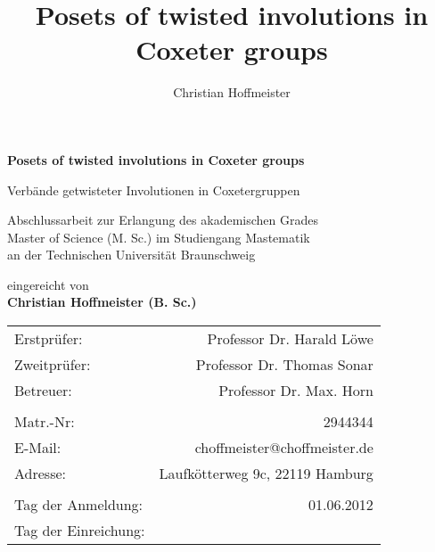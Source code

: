 \title{Posets of twisted involutions in Coxeter groups}
\author{Christian Hoffmeister}

\begin{titlepage}
\begin{center}
{\Large \bf Posets of twisted involutions in Coxeter groups}

{\large Verbände getwisteter Involutionen in Coxetergruppen}

\vspace*{4cm}
Abschlussarbeit zur Erlangung des akademischen Grades\\Master of Science (M. Sc.) im Studiengang Mastematik\\an der Technischen Universität Braunschweig

\vspace*{4cm}
eingereicht von \\
{\Large \bf Christian Hoffmeister (B. Sc.)}

\vspace*{4cm}
\begin{tabular}{lr}
	Erstprüfer: & Professor Dr. Harald Löwe \\
	Zweitprüfer: & Professor Dr. Thomas Sonar \\
	Betreuer: & Professor Dr. Max. Horn \\
	\vspace*{0.5em} & \\
	Matr.-Nr: & 2944344 \\
	E-Mail: & choffmeister@choffmeister.de \\
	Adresse: & Laufkötterweg 9c, 22119 Hamburg \\
	\vspace*{0.5em} & \\
	Tag der Anmeldung: & 01.06.2012 \\
	Tag der Einreichung: & \\
\end{tabular}
\end{center}
\end{titlepage}
